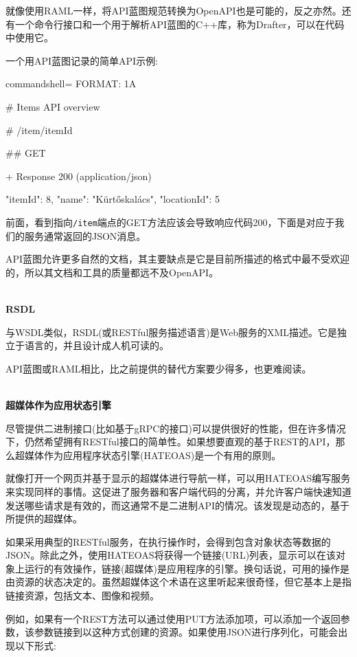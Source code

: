 就像使用RAML一样，将API蓝图规范转换为OpenAPI也是可能的，反之亦然。还有一个命令行接口和一个用于解析API蓝图的C++库，称为Drafter，可以在代码中使用它。

一个用API蓝图记录的简单API示例:

\begin{tcblisting}{commandshell={}}
FORMAT: 1A

# Items API overview

# /item/{itemId}

## GET

+ Response 200 (application/json)

    {
      "itemId": 8,
      "name": "Kürtőskalács",
      "locationId": 5
    }
\end{tcblisting}

前面，看到指向\texttt{/item}端点的GET方法应该会导致响应代码200，下面是对应于我们的服务通常返回的JSON消息。

API蓝图允许更多自然的文档，其主要缺点是它是目前所描述的格式中最不受欢迎的，所以其文档和工具的质量都远不及OpenAPI。

\hspace*{\fill} \\ %
\noindent
\textbf{RSDL}

与WSDL类似，RSDL(或RESTful服务描述语言)是Web服务的XML描述。它是独立于语言的，并且设计成人机可读的。

API蓝图或RAML相比，比之前提供的替代方案要少得多，也更难阅读。

\hspace*{\fill} \\ %
\noindent
\textbf{超媒体作为应用状态引擎}

尽管提供二进制接口(比如基于gRPC的接口)可以提供很好的性能，但在许多情况下，仍然希望拥有RESTful接口的简单性。如果想要直观的基于REST的API，那么超媒体作为应用程序状态引擎(HATEOAS)是一个有用的原则。

就像打开一个网页并基于显示的超媒体进行导航一样，可以用HATEOAS编写服务来实现同样的事情。这促进了服务器和客户端代码的分离，并允许客户端快速知道发送哪些请求是有效的，而这通常不是二进制API的情况。该发现是动态的，基于所提供的超媒体。

如果采用典型的RESTful服务，在执行操作时，会得到包含对象状态等数据的JSON。除此之外，使用HATEOAS将获得一个链接(URL)列表，显示可以在该对象上运行的有效操作，链接(超媒体)是应用程序的引擎。换句话说，可用的操作是由资源的状态决定的。虽然超媒体这个术语在这里听起来很奇怪，但它基本上是指链接资源，包括文本、图像和视频。

例如，如果有一个REST方法可以通过使用PUT方法添加项，可以添加一个返回参数，该参数链接到以这种方式创建的资源。如果使用JSON进行序列化，可能会出现以下形式:

